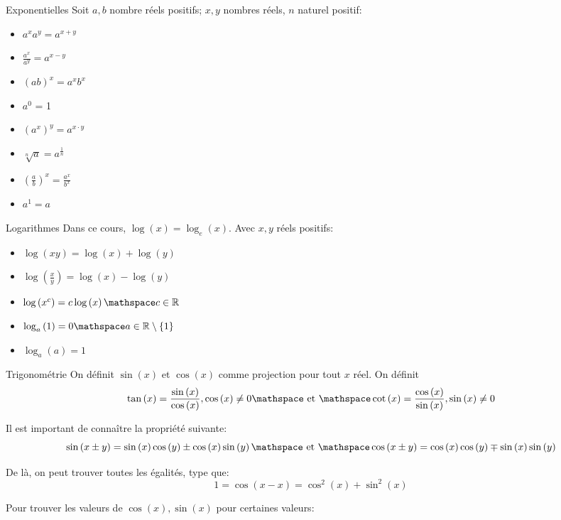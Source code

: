 \documentclass{article}
\begin{document}
\begin{parag}{Exponentielles}
    Soit $a, b$ nombre réels positifs; $x, y$ nombres réels, $n$ naturel positif:
    \begin{itemize}
        \item $a^x a^y = a^{x+y}$
        \item $\frac{a^x}{a^y} = a^{x-y}$
        \item $\left(ab\right)^x = a^x b^x$
        \item $a^0$ = 1 
        \item $\left(a^x\right)^y = a^{x\cdot y}$
        \item $\sqrt[n]{a} = a^{\frac{1}{n}}$
        \item $\left(\frac{a}{b}\right)^x = \frac{a^x}{b^x}$
        \item $a^1 = a$
    \end{itemize}
    
\end{parag}

\begin{parag}{Logarithmes}
    Dans ce cours, $\log\left(x\right) = \log_e\left(x\right)$. Avec $x, y$ réels positifs:
    \begin{itemize}
        \item $\log\left(xy\right) = \log\left(x\right) + \log\left(y\right)$
        \item $\log\left(\frac{x}{y}\right) = \log\left(x\right) - \log\left(y\right)$
        \item $\log\left(x^c\right) = c\log\left(x\right) \mathspace c\in\mathbb{R}$
        \item $\log_a\left(1\right) = 0 \mathspace a \in \mathbb{R} \setminus \left\{1\right\}$
        \item $\log_a\left(a\right)=1$
    \end{itemize}
    
\end{parag}

\begin{parag}{Trigonométrie}
    On définit $\sin\left(x\right)$ et $\cos\left(x\right)$ comme projection pour tout $x$ réel. On définit 
    \[\tan\left(x\right) = \frac{\sin\left(x\right)}{\cos\left(x\right)}, \cos\left(x\right) \neq 0 \mathspace \text{ et } \mathspace \cot\left(x\right) = \frac{\cos\left(x\right)}{\sin\left(x\right)}, \sin\left(x\right) \neq 0\]
    
    Il est important de connaître la propriété suivante: 
    \[\sin\left(x \pm y\right) = \sin\left(x\right)\cos\left(y\right) \pm \cos\left(x\right)\sin\left(y\right) \mathspace \text{ et } \mathspace \cos\left(x \pm y\right) = \cos\left(x\right)\cos\left(y\right) \mp \sin\left(x\right)\sin\left(y\right)\]

   De là, on peut trouver toutes les égalités, type que:
   \[1 = \cos\left(x - x\right) = \cos^2\left(x\right) + \sin^2\left(x\right)\]

   Pour trouver les valeurs de $\cos\left(x\right), \sin\left(x\right)$ pour certaines valeurs:

\end{parag}
\end{document}

